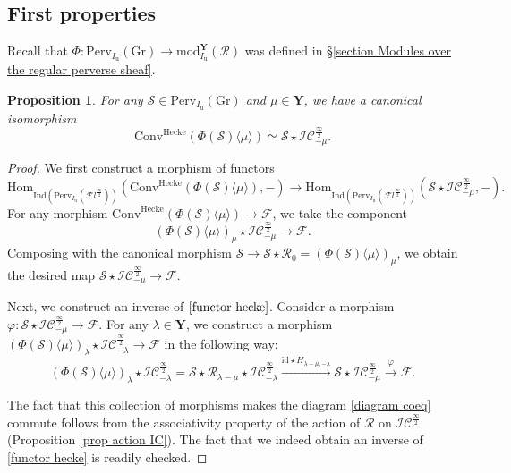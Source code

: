 \documentclass[11pt]{amsart}
\theoremstyle{plain}
\newtheorem{prop}[thm]{Proposition}
\theoremstyle{remark}
\numberwithin{equation}{section}
\begin{document}
\subsection{First properties}\label{section first properties}
 Recall that $\Phi:\mathrm{Perv}_{I_\mathrm{u}}(\mathrm{Gr})\to \mathrm{mod}^\mathbf{Y}_{I_\mathrm{u}}(\mathcal{R})$ was defined in §\ref{section Modules over the regular perverse sheaf}.

	\begin{prop}{{\cite[Proposition 3.1.2]{ABBGM}}}\label{prop can isom}
		For any $\mathcal{S}\in\mathrm{Perv}_{I_\mathrm{u}}(\mathrm{Gr})$ and $\mu\in\mathbf{Y}$, we have a canonical isomorphism
		$$\mathrm{Conv}^{\mathrm{Hecke}}(\Phi(\mathcal{S})\langle\mu\rangle)\simeq \mathcal{S}\star\mathcal{IC}^{\frac{\infty}{2}}_{-\mu}. $$
	\end{prop}
	\begin{proof}
		We first construct a morphism of functors 
		\begin{equation}\label{functor hecke}
			\mathrm{Hom}_{\mathrm{Ind}(\mathrm{Perv}_{{I_\mathrm{u}}}(\mathcal{F}l^{\frac{\infty}{2}}))}\left(\mathrm{Conv}^{\mathrm{Hecke}}(\Phi(\mathcal{S})\langle\mu\rangle),-\right)\to  \mathrm{Hom}_{\mathrm{Ind}(\mathrm{Perv}_{{I_\mathrm{u}}}(\mathcal{F}l^{\frac{\infty}{2}}))}\left(\mathcal{S}\star\mathcal{IC}^{\frac{\infty}{2}}_{-\mu},-\right).
		\end{equation}
		For any morphism $\mathrm{Conv}^{\mathrm{Hecke}}(\Phi(\mathcal{S})\langle\mu\rangle)\to \mathcal{F}$, we take the component 
		$$(\Phi(\mathcal{S})\langle\mu\rangle)_{\mu}\star \mathcal{IC}^{\frac{\infty}{2}}_{-\mu}\to \mathcal{F}.$$
		Composing with the canonical morphism $\mathcal{S}\to\mathcal{S}\star\mathcal{R}_0=(\Phi(\mathcal{S})\langle\mu\rangle)_{\mu}$, we obtain the desired map $\mathcal{S}\star \mathcal{IC}^{\frac{\infty}{2}}_{-\mu}\to \mathcal{F}$.
		
		Next, we construct an inverse of $\eqref{functor hecke}$. Consider a morphism $\varphi:\mathcal{S}\star \mathcal{IC}^{\frac{\infty}{2}}_{-\mu}\to \mathcal{F}$. For any $\lambda\in\mathbf{Y}$, we construct a morphism $(\Phi(\mathcal{S})\langle\mu\rangle)_{\lambda}\star \mathcal{IC}^{\frac{\infty}{2}}_{-\lambda}\to \mathcal{F}$ in the following way:
		$$(\Phi(\mathcal{S})\langle\mu\rangle)_{\lambda}\star \mathcal{IC}^{\frac{\infty}{2}}_{-\lambda}=\mathcal{S}\star\mathcal{R}_{\lambda-\mu}\star \mathcal{IC}^{\frac{\infty}{2}}_{-\lambda}\xrightarrow{\mathrm{id}\star H_{\lambda-\mu,-\lambda}}\mathcal{S}\star\mathcal{IC}^{\frac{\infty}{2}}_{-\mu}\xrightarrow{\varphi} \mathcal{F}. $$
		
		The fact that this collection of morphisms makes the diagram \eqref{diagram coeq} commute follows from the associativity property of the action of $\mathcal{R}$ on $\mathcal{IC}^{\frac{\infty}{2}}$ (Proposition \ref{prop action IC}). The fact that we indeed obtain an inverse of \eqref{functor hecke} is readily checked.
	\end{proof}
\end{document}
